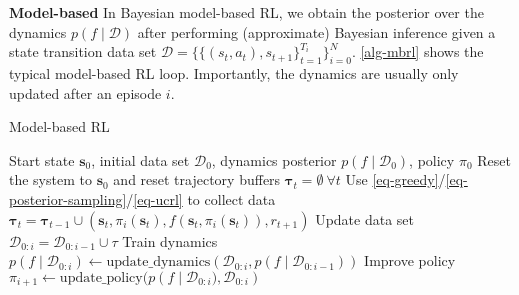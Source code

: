 \documentclass{article}
\newcommand{\state}{\ensuremath{\mathbf{s}}}
\newcommand{\action}{\ensuremath{\mathbf{a}}}
\newcommand{\dataset}{\ensuremath{\mathcal{D}}}
\newcommand{\transitionFn}{\ensuremath{f}}
\newcommand{\policy}{\ensuremath{\pi}}
\begin{document}
\textbf{Model-based}
In Bayesian model-based RL, we obtain the posterior over the dynamics \(p(f\mid\mathcal{D})\) after performing (approximate) Bayesian
inference given a state transition data set \(\mathcal{D} = \{\{(s_{t},a_{t}), s_{t+1}\}^{T_{i}}_{t=1}\}_{i=0}^{N}\).
\cref{alg-mbrl} shows the typical model-based RL loop.
Importantly, the dynamics are usually only updated after an episode $i$.

\begin{algorithm}[!b]
\caption{Model-based RL}\label{alg-mbrl}
\begin{algorithmic}[1]
  \Require Start state $\state_{0}$, initial data set $\dataset_{0}$, dynamics posterior $p(\transitionFn \mid \dataset_{0})$, policy $\policy_{0}$
    \State Reset the system to $\state_{0}$ and reset trajectory buffers $\bm\tau_{t} = \emptyset \ \forall t$
      \State Use \cref{eq-greedy}/\cref{eq-posterior-sampling}/\cref{eq-ucrl} to collect data $\bm\tau_{t} = \bm\tau_{t-1} \cup (\state_{t}, \policy_{i}(\state_{t}), \transitionFn(\state_{t}, \policy_{i}(\state_{t})), r_{t+1})$
    \EndFor
    \State Update data set $\dataset_{0:i} = \dataset_{0:i-1} \cup \tau$
    \State Train dynamics $p(\transitionFn \mid \dataset_{0:i}) \leftarrow \text{update\_dynamics}(\dataset_{0:i}, p(\transitionFn \mid \dataset_{0:i-1}))$
    \State Improve policy $\pi_{i+1} \leftarrow \text{update\_policy}(p\left(\transitionFn \mid \dataset_{0:i}), \dataset_{0:i} \right)$
\EndFor
\end{algorithmic}
\end{algorithm}
\end{document}
